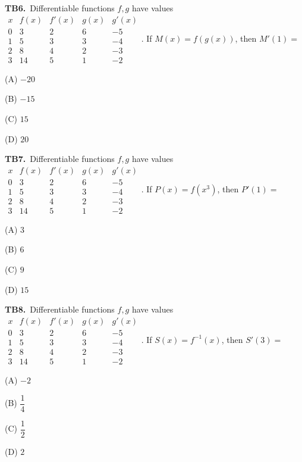 \documentclass[11pt]{article}
\begin{document}
\bigskip\noindent\textbf{TB6.}\ Differentiable functions $f,g$ have values $\begin{array}{c|rrrr}x&f(x)&f\prime(x)&g(x)&g\prime(x)\\0&3&2&6&-5\\1&5&3&3&-4\\2&8&4&2&-3\\3&14&5&1&-2\end{array}$. If $M(x) = f(g(x))$, then $M'(1) =$
\begin{list}{}{\setlength{\leftmargin}{3em}\setlength{\labelwidth}{2.5em}\setlength{\itemsep}{0pt}\setlength{\topsep}{2pt}}
\item[(A)] $-20$
\item[(B)] $-15$
\item[(C)] $15$
\item[(D)] $20$
\end{list}

\bigskip\noindent\textbf{TB7.}\ Differentiable functions $f,g$ have values $\begin{array}{c|rrrr}x&f(x)&f\prime(x)&g(x)&g\prime(x)\\0&3&2&6&-5\\1&5&3&3&-4\\2&8&4&2&-3\\3&14&5&1&-2\end{array}$. If $P(x) = f(x^3)$, then $P'(1) =$
\begin{list}{}{\setlength{\leftmargin}{3em}\setlength{\labelwidth}{2.5em}\setlength{\itemsep}{0pt}\setlength{\topsep}{2pt}}
\item[(A)] $3$
\item[(B)] $6$
\item[(C)] $9$
\item[(D)] $15$
\end{list}

\bigskip\noindent\textbf{TB8.}\ Differentiable functions $f,g$ have values $\begin{array}{c|rrrr}x&f(x)&f\prime(x)&g(x)&g\prime(x)\\0&3&2&6&-5\\1&5&3&3&-4\\2&8&4&2&-3\\3&14&5&1&-2\end{array}$. If $S(x) = f^{-1}(x)$, then $S'(3) =$
\begin{list}{}{\setlength{\leftmargin}{3em}\setlength{\labelwidth}{2.5em}\setlength{\itemsep}{0pt}\setlength{\topsep}{2pt}}
\item[(A)] $-2$
\item[(B)] $\dfrac{1}{4}$
\item[(C)] $\dfrac{1}{2}$
\item[(D)] $2$
\end{list}
\end{document}
